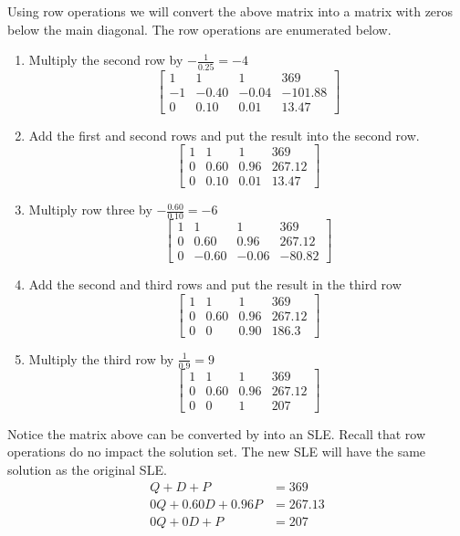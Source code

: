 Using row operations we will convert the above matrix into a matrix with zeros below the main diagonal.   The row operations are enumerated below.
\begin{enumerate}
    \item Multiply the second row by $-\frac{1}{0.25} = -4$
\[
\begin{bmatrix}
1 & 1 & 1 & 369 \\
-1 & -0.40 & -0.04 & -101.88 \\
0 & 0.10 & 0.01 & 13.47
\end{bmatrix}
\]
\item Add the first and second rows and put the result into the second row.
\[
\begin{bmatrix}
1 & 1 & 1 & 369 \\
0 & 0.60 & 0.96 & 267.12 \\
0 & 0.10 & 0.01 & 13.47
\end{bmatrix}
\]

\item Multiply row three by $-\frac{0.60}{0.10} = -6$
\[
\begin{bmatrix}
1 & 1 & 1 & 369 \\
0 & 0.60 & 0.96 & 267.12 \\
0 & -0.60 & -0.06 & -80.82
\end{bmatrix}
\]

\item Add the second and third rows and put the result in the third row
\[
\begin{bmatrix}
1 & 1 & 1 & 369 \\
0 & 0.60 & 0.96 & 267.12 \\
0 & 0 & 0.90 & 186.3
\end{bmatrix}
\]

\item Multiply the third row by $\frac{1}{0.9} = 9$
\[
\begin{bmatrix}
1 & 1 & 1 & 369 \\
0 & 0.60 & 0.96 & 267.12 \\
0 & 0 & 1 & 207
\end{bmatrix}
\]
\end{enumerate}

Notice the matrix above can be converted by into an SLE.  Recall that row operations do no impact the solution set.  The new SLE will have the same solution as the original SLE.
\begin{align*}
    Q + D + P &= 369  \\
    0Q + 0.60D + 0.96P &= 267.13 \\
    0Q + 0D + P &= 207
\end{align*}

